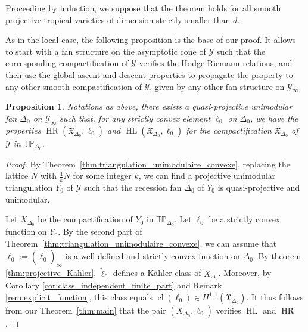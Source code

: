 \documentclass[11pt]{amsart}
\newtheorem{prop}[thm]{Proposition}
\theoremstyle{definition}
\numberwithin{equation}{section}
\renewcommand{\~}{\widetilde}
\DeclareMathOperator{\HR}{HR} %
\DeclareMathOperator{\HL}{HL} %
\DeclareMathOperator{\class}{cl} %
\newcommand{\TP}{\mathbb{TP}} %
\newcommand{\X}{\mathfrak X}
\newcommand{\Y}{\mathscr Y}
\begin{document}
\medskip

Proceeding by induction, we suppose that the theorem holds for all smooth projective tropical varieties of dimension strictly smaller than $d$.

\medskip

As in the local case, the following proposition is the base of our proof. It allows to start with a fan structure on the asymptotic cone of $\Y$ such that the corresponding compactification of $\Y$ verifies the Hodge-Riemann relations, and then use the global ascent and descent properties to propagate the property to any other smooth compactification of $\Y$, given by any other fan structure on $\Y_\infty$.

\begin{prop}\label{prop:baseHR-global}
Notations as above, there exists a quasi-projective unimodular fan $\Delta_0$ on $\Y_\infty$ such that, for any strictly convex element $\ell_0$ on $\Delta_0$, we have the properties $\HR(\X_{\Delta_0}, \ell_0)$ and $\HL(\X_{\Delta_0}, \ell_0)$ for the compactification $\X_{\Delta_0}$ of $\Y$ in $\TP_{\Delta_0}$.
\end{prop}
\begin{proof} By Theorem~\ref{thm:triangulation_unimodulaire_convexe}, replacing the lattice $N$ with $\frac 1k N$ for some integer $k$, we can find a projective unimodular triangulation $Y_0$ of $\Y$ such that the recession fan $\Delta_0$ of $Y_0$ is quasi-projective and unimodular.

Let $X_{\Delta_0}$ be the compactification of $Y_0$ in $\TP_{\Delta_0}$. Let $\~\ell_0$ be a strictly convex function on $Y_0$. By the second part of Theorem~\ref{thm:triangulation_unimodulaire_convexe}, we can assume that $\ell_0:=(\~\ell_0)_\infty$ is a well-defined and strictly convex function on $\Delta_0$. By theorem \ref{thm:projective_Kahler}, $\~\ell_0$ defines a Kähler class of $X_{\Delta_0}$. Moreover, by Corollary \ref{cor:class_independent_finite_part} and Remark \ref{rem:explicit_function}, this class equals $\class(\ell_0)\in H^{1,1}(\X_{\Delta_0})$. It thus follows from our Theorem~\ref{thm:main} that the pair $(X_{\Delta_0}, \ell_{0})$ verifies $\HL$ and $\HR$.
\end{proof}
\end{document}
